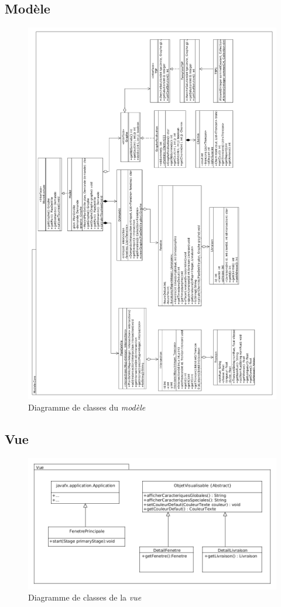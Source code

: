\documentclass[10pt,a4paper]{book}
\begin{document}
\subsection{Modèle}
\begin{figure}[h!]
    \centering
    \includegraphics[scale=0.35]{modele.png}
    \caption{Diagramme de classes du \textit{modèle}}
\end{figure}
\newpage
\subsection{Vue}
\begin{figure}[h!]
    \centering
    \includegraphics[scale=0.4]{vue.png}
    \caption{Diagramme de classes de la \textit{vue}}
\end{figure}
\end{document}
